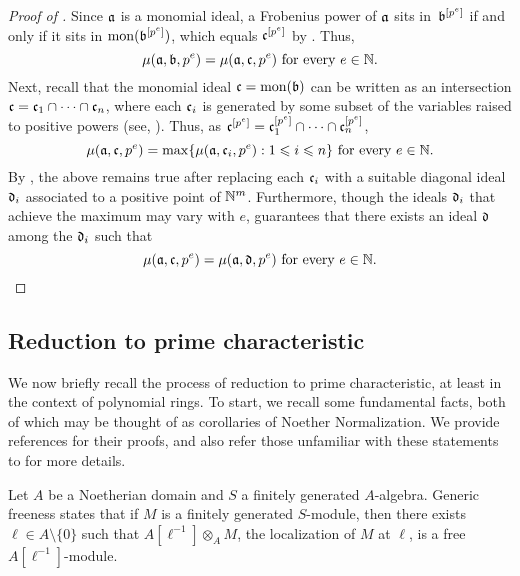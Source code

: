 \documentclass{amsart}
\begin{document}
\begin{proof}[Proof of ]
   Since $\mathfrak{a}$ is a monomial ideal, a Frobenius power of $\mathfrak{a}$ sits in~$\mathfrak{b}^{[p^e]}$ if and only if it sits in $\operatorname{mon}(\mathfrak{b}^{[p^e]})$, which equals $\mathfrak{c}^{[p^e]}$ by .
   Thus, \[\mu(\mathfrak{a}, \mathfrak{b}, p^e) = \mu(\mathfrak{a}, \mathfrak{c}, p^e)\text{ for every $e\in \mathbb{N}$.}\]
   Next, recall that the monomial ideal $\mathfrak{c} = \operatorname{mon}(\mathfrak{b})$ can be written as an intersection $\mathfrak{c} = \mathfrak{c}_1 \cap \cdots \cap \mathfrak{c}_n$, where each $\mathfrak{c}_i$ is generated by some subset of the variables raised to positive powers (see, \eg \cite[Lemma 5.18]{miller+sturmfels.combinatorial_CA}).
   Thus, as $\mathfrak{c}^{[p^e]} = \mathfrak{c}_1^{[p^e]} \cap \cdots \cap \mathfrak{c}_n^{[p^e]}$, 
   \[
      \mu(\mathfrak{a}, \mathfrak{c}, p^e) = \max\{\mu(\mathfrak{a}, \mathfrak{c}_i, p^e): 1\leqslant i\leqslant n\}\text{ for every $e\in \mathbb{N}$}.
   \]
   By , the above remains true after replacing each $\mathfrak{c}_i$ with a suitable diagonal ideal $\mathfrak{d}_i$ associated to a positive point of $\mathbb{N}^m$.
   Furthermore, though the ideals $\mathfrak{d}_i$ that achieve the maximum may vary with $e$,  guarantees that there exists an ideal $\mathfrak{d}$ among the $\mathfrak{d}_i$ such that
   \[\mu(\mathfrak{a}, \mathfrak{c}, p^e) = \mu(\mathfrak{a}, \mathfrak{d}, p^e)\text{ for every $e\in \mathbb{N}$}.\qedhere\]
\end{proof}
 
\subsection{Reduction to prime characteristic}

We now briefly recall the process of reduction to prime characteristic, at least in the context of polynomial rings.  To start, we recall some fundamental facts, both of which may be thought of as corollaries of Noether Normalization.  We provide references for their proofs, and also refer those unfamiliar with these statements to \cite[Chapter 3]{hernandez.thesis} for more details.

\begin{remark} \label{generic-freeness}
   Let $A$ be a Noetherian domain and $S$ a finitely generated $A$-algebra.
   Generic freeness states that if $M$ is a finitely generated $S$-module, then there exists  $\ell \in A \setminus \{0\}$ such that $A[\ell^{-1}] \otimes_A M$, the localization of $M$ at $\ell$, is a free $A[\ell^{-1}]$-module.
\end{remark}
\end{document}

